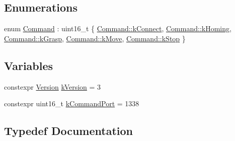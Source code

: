 \subsection*{Enumerations}
\begin{DoxyCompactItemize}
\item 
enum \hyperlink{namespaceresearch__interface_1_1gripper_adeda0327764e059bac8a5f967ce41590}{Command} \+: uint16\+\_\+t \{ \newline
\hyperlink{namespaceresearch__interface_1_1gripper_adeda0327764e059bac8a5f967ce41590a58b5894a4d9f4ad3848df7a9021998d9}{Command\+::k\+Connect}, 
\hyperlink{namespaceresearch__interface_1_1gripper_adeda0327764e059bac8a5f967ce41590a9906cfd5255fe1185f9bf80b01951ef8}{Command\+::k\+Homing}, 
\hyperlink{namespaceresearch__interface_1_1gripper_adeda0327764e059bac8a5f967ce41590a1faf654242c6ff5fa68bb11879664c78}{Command\+::k\+Grasp}, 
\hyperlink{namespaceresearch__interface_1_1gripper_adeda0327764e059bac8a5f967ce41590ae54c7412401b5e36c1c254e6fb17a3dd}{Command\+::k\+Move}, 
\newline
\hyperlink{namespaceresearch__interface_1_1gripper_adeda0327764e059bac8a5f967ce41590a97bebae73e3334ef0c946c5df81e440b}{Command\+::k\+Stop}
 \}
\end{DoxyCompactItemize}
\subsection*{Variables}
\begin{DoxyCompactItemize}
\item 
constexpr \hyperlink{namespaceresearch__interface_1_1gripper_a76ede520b2fa3582ac95cd919eceef5b}{Version} \hyperlink{namespaceresearch__interface_1_1gripper_a9f7080493bb2d8257d1d88e302739c46}{k\+Version} = 3
\item 
constexpr uint16\+\_\+t \hyperlink{namespaceresearch__interface_1_1gripper_a15061abce0d0ad8fc0dc04afbfdc71c4}{k\+Command\+Port} = 1338
\end{DoxyCompactItemize}


\subsection{Typedef Documentation}
\mbox{\label{namespaceresearch__interface_1_1gripper_a76ede520b2fa3582ac95cd919eceef5b}} 
